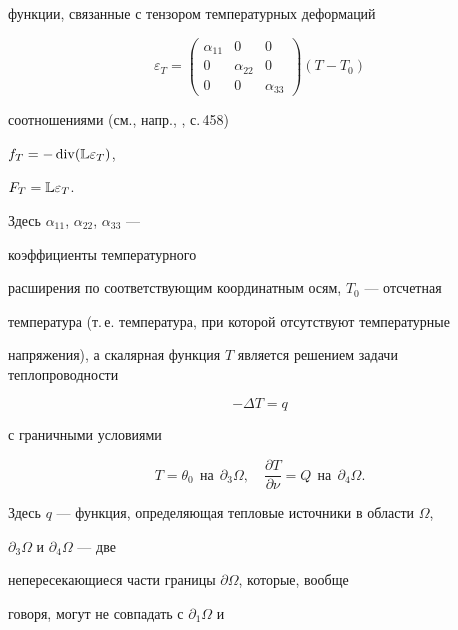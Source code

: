 функции, связанные с тензором температурных деформаций


$$


\varepsilon_T =


\begin{pmatrix}


\alpha_{11} & 0  & 0 \\


0 & \alpha_{22} & 0 \\


0 & 0  & \alpha_{33}


\end{pmatrix} (T-T_0)


$$


соотношениями (см., напр., \cite{TiGu}, с.\,458)


$f_T=-\operatorname{div}({\Bbb L}\varepsilon_T)$,


$F_T={\Bbb L}\varepsilon_T$.


Здесь $\alpha_{11}$, $\alpha_{22}$, $\alpha_{33}$ --- 


коэффициенты температурного


расширения по соответствующим координатным осям, $T_0$ --- отсчетная


температура (т.\,е. температура, при которой отсутствуют температурные


напряжения), а скалярная функция $T$ является решением задачи теплопроводности


\begin{equation}\label{th1}


-\Delta T = q


\end{equation}


с граничными условиями


\begin{equation}


\label{th2}


T=\theta_0\ \ \text{на}\ \ \partial_3\Omega, \quad


\frac{\partial T}{\partial \nu} = Q \ \ \text{на} \ \ \partial_4\Omega.


\end{equation}


Здесь $q$ --- функция, определяющая тепловые источники в области $\Omega$,


$\partial_3 \Omega$ и $\partial_4 \Omega$ --- две


непересекающиеся части границы $\partial \Omega$, которые, вообще


говоря, могут не совпадать с $\partial_1 \Omega$ и


